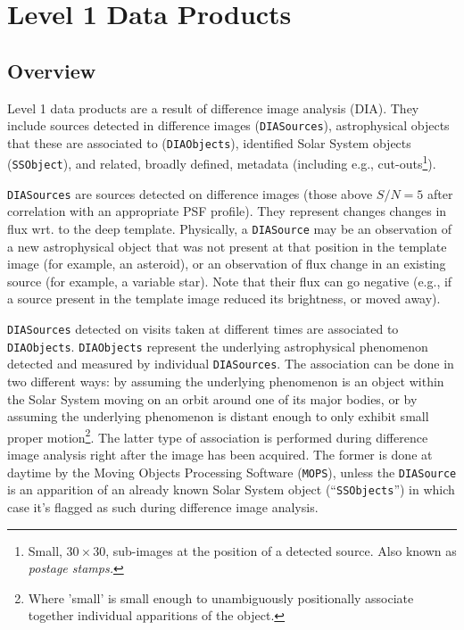 \documentclass[12pt]{article}
\newcommand{\code}[1]{\texttt{#1}}
\newcommand{\DIASource}{\code{DIASource}\xspace}
\newcommand{\DIASources}{\code{DIASources}\xspace}
\newcommand{\DIAObjects}{\code{DIAObjects}\xspace}
\newcommand{\SSObject}{\code{SSObject}\xspace}
\newcommand{\SSObjects}{\code{SSObjects}\xspace}
\begin{document}


\section{Level 1 Data Products}

\subsection{Overview}

Level 1 data products are a result of difference image analysis (DIA). They include sources detected in difference images (\DIASources), astrophysical objects that these are associated to (\DIAObjects), identified Solar System objects (\SSObject), and related, broadly defined, metadata (including e.g., cut-outs\footnote{Small, $30 \times 30$, sub-images at the position of a detected source. Also known as {\em postage stamps.}}).

\DIASources are sources detected on difference images (those above $S/N=5$ after correlation with an appropriate PSF profile). They represent changes changes in flux wrt. to the deep template. Physically, a \DIASource may be an observation of a new astrophysical object that was not present at that position in the template image (for example, an asteroid), or an observation of flux change in an existing source (for example, a variable star). Note that their flux can go negative (e.g., if a source present in the template image reduced its brightness, or moved away).

\DIASources detected on visits taken at different times are associated to \DIAObjects. \DIAObjects represent the underlying astrophysical phenomenon detected and measured by individual \DIASources. The association can be done in two different ways: by assuming the underlying phenomenon is an object within the Solar System moving on an orbit around one of its major bodies, or by assuming the underlying phenomenon is distant enough to only exhibit small proper motion\footnote{Where 'small' is small enough to unambiguously positionally associate together individual apparitions of the object.}. The latter type of association is performed during difference image analysis right after the image has been acquired. The former is done at daytime by the Moving Objects Processing Software (\code{MOPS}), unless the \DIASource is an apparition of an already known Solar System object (``\SSObjects'') in which case it's flagged as such during difference image analysis.
\end{document}

